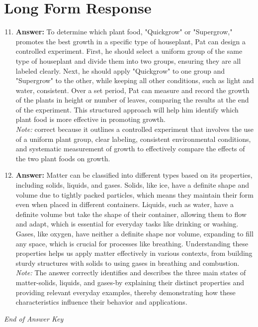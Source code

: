 \documentclass[12pt]{article}
\begin{document}
\section*{Long Form Response}
\begin{enumerate}[label=\arabic*.]
\setcounter{enumi}{10}
\item \textbf{Answer:} To determine which plant food, "Quickgrow" or "Supergrow," promotes the best growth in a specific type of houseplant, Pat can design a controlled experiment. First, he should select a uniform group of the same type of houseplant and divide them into two groups, ensuring they are all labeled clearly. Next, he should apply "Quickgrow" to one group and "Supergrow" to the other, while keeping all other conditions, such as light and water, consistent. Over a set period, Pat can measure and record the growth of the plants in height or number of leaves, comparing the results at the end of the experiment. This structured approach will help him identify which plant food is more effective in promoting growth.
\\ \textit{Note:} correct because it outlines a controlled experiment that involves the use of a uniform plant group, clear labeling, consistent environmental conditions, and systematic measurement of growth to effectively compare the effects of the two plant foods on growth.
\item \textbf{Answer:} Matter can be classified into different types based on its properties, including solids, liquids, and gases. Solids, like ice, have a definite shape and volume due to tightly packed particles, which means they maintain their form even when placed in different containers. Liquids, such as water, have a definite volume but take the shape of their container, allowing them to flow and adapt, which is essential for everyday tasks like drinking or washing. Gases, like oxygen, have neither a definite shape nor volume, expanding to fill any space, which is crucial for processes like breathing. Understanding these properties helps us apply matter effectively in various contexts, from building sturdy structures with solids to using gases in breathing and combustion.
\\ \textit{Note:} The answer correctly identifies and describes the three main states of matter-solids, liquids, and gases-by explaining their distinct properties and providing relevant everyday examples, thereby demonstrating how these characteristics influence their behavior and applications.
\end{enumerate}

\vfill
\noindent\textit{End of Answer Key}
\end{document}

